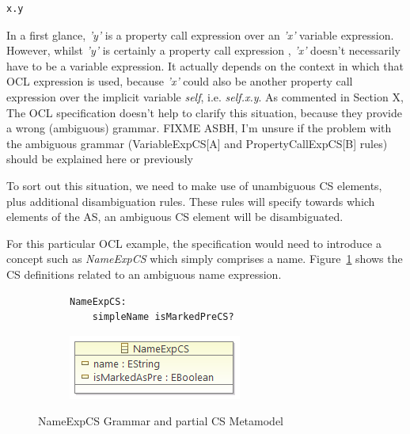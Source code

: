 \documentclass{llncs}
\begin{document}
\begin{lstlisting}[language=OCL]
x.y
\end{lstlisting}

In a first glance, \emph{'y'} is a property call expression over an \emph{'x'} variable expression. However, whilst \emph{'y'} is certainly a property call expression , \emph{'x'} doesn't necessarily have to be a variable expression. It actually depends on the context in which that OCL expression is used, because \emph{'x'} could also be another property call expression over the implicit variable \emph{self}, i.e. \emph{self.x.y}. As commented in Section X, The OCL specification doesn't help to clarify this situation, because they provide a wrong (ambiguous) grammar. FIXME ASBH, I'm unsure if the problem with the ambiguous grammar (VariableExpCS[A] and PropertyCallExpCS[B] rules) should be explained here or previously

To sort out this situation, we need to make use of unambiguous CS elements, plus additional disambiguation rules. These rules will specify towards which elements of the AS, an ambiguous CS element will be disambiguated. 

For this particular OCL example, the specification would need to introduce a concept such as \emph{NameExpCS} which simply comprises a name. Figure~\ref{fig:NameExpCS} shows the CS definitions related to an ambiguous name expression. 

\begin{figure}[htbp]
\centering
\begin{subfigure}{0.5\textwidth}
  \centering
 \begin{lstlisting}[label=lst:NameExpEBNF, language=Xtext]
 NameExpCS:
 	simpleName isMarkedPreCS?
 \end{lstlisting} 
\end{subfigure}%
\begin{subfigure}{0.5\textwidth}
  \centering
  \includegraphics[scale=0.75]{images/NameExpCS.png}
\end{subfigure}
\caption{NameExpCS Grammar and partial CS Metamodel}
\label{fig:NameExpCS}
\end{figure}
\end{document}

